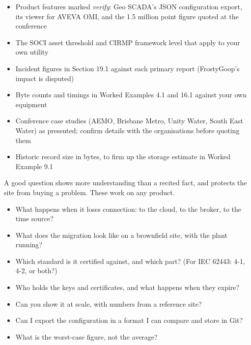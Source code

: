 \begin{itemize}
\item[!] Product features marked \emph{verify}: Geo SCADA's JSON configuration export, its viewer for AVEVA OMI, and the 1.5 million point figure quoted at the conference
\item[!] The SOCI asset threshold and CIRMP framework level that apply to your own utility
\item[!] Incident figures in Section 19.1 against each primary report (FrostyGoop's impact is disputed)
\item[!] Byte counts and timings in Worked Examples 4.1 and 16.1 against your own equipment
\item[!] Conference case studies (AEMO, Brisbane Metro, Unity Water, South East Water) as presented; confirm details with the organisations before quoting them
\item[!] Historic record size in bytes, to firm up the storage estimate in Worked Example 9.1
\end{itemize}

A good question shows more understanding than a recited fact, and protects the site from buying a problem. These work on any product.

\begin{itemize}
\item What happens when it loses connection: to the cloud, to the broker, to the time source?
\item What does the migration look like on a brownfield site, with the plant running?
\item Which standard is it certified against, and which part? (For IEC 62443: 4-1, 4-2, or both?)
\item Who holds the keys and certificates, and what happens when they expire?
\item Can you show it at scale, with numbers from a reference site?
\item Can I export the configuration in a format I can compare and store in Git?
\item What is the worst-case figure, not the average?
\end{itemize}

